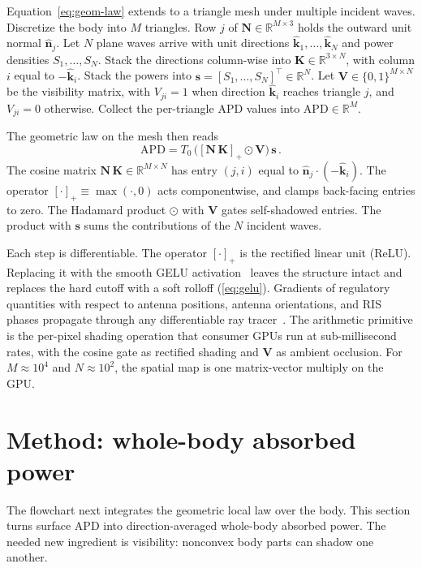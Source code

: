 \documentclass[journal,twocolumn,10pt]{IEEEtran}
\theoremstyle{plain}
\newcommand{\khat}{\hat{\bm{k}}}
\newcommand{\nhat}{\hat{\bm{n}}}
\newcommand{\pospart}[1]{\left[#1\right]_{+}}
\begin{document}
Equation~\eqref{eq:geom-law} extends to a triangle mesh under
multiple incident waves. Discretize the body into $M$ triangles. Row $j$ of
$\mathbf{N} \in \mathbb{R}^{M\times 3}$ holds the outward unit
normal $\nhat_j$. Let $N$ plane waves arrive with unit directions
$\khat_1, \ldots, \khat_N$ and power densities $S_1, \ldots, S_N$.
Stack the directions column-wise into
$\mathbf{K} \in \mathbb{R}^{3\times N}$, with column $i$ equal to
$-\khat_i$. Stack the powers into
$\mathbf{s} = [S_1,\ldots,S_N]^\top \in \mathbb{R}^N$. Let
$\mathbf{V} \in \{0,1\}^{M\times N}$ be the visibility matrix, with
$V_{ji} = 1$ when direction $\khat_i$ reaches triangle $j$, and
$V_{ji} = 0$ otherwise. Collect the per-triangle APD values into
$\bm{\mathrm{APD}} \in \mathbb{R}^{M}$.

The geometric law on the mesh then reads
\begin{equation}\label{eq:mat-multi}
  \bm{\mathrm{APD}} = T_0\,\bigl(\pospart{\mathbf{N}\,\mathbf{K}}
  \odot \mathbf{V}\bigr)\,\mathbf{s}\, .
\end{equation}
The cosine matrix $\mathbf{N}\,\mathbf{K} \in \mathbb{R}^{M\times N}$
has entry $(j,i)$ equal to $\nhat_j\cdot(-\khat_i)$. The operator
$\pospart{\cdot} \equiv \max(\cdot,0)$ acts componentwise, and clamps
back-facing entries to zero. The Hadamard product $\odot$ with
$\mathbf{V}$ gates self-shadowed entries. The product with
$\mathbf{s}$ sums the contributions of the $N$ incident waves.

Each step is differentiable. The operator $\pospart{\cdot}$ is the
rectified linear unit (ReLU). Replacing it with the smooth
\gls{GELU} activation~\cite{Hendrycks2016} leaves the structure
intact and replaces the hard cutoff with a soft rolloff
(\cref{eq:gelu}). Gradients of regulatory quantities with respect to
antenna positions, antenna orientations, and RIS phases propagate
through any differentiable ray tracer~\cite{SionnaRT}. The arithmetic
primitive is the per-pixel shading operation that consumer GPUs run
at sub-millisecond rates, with the cosine gate as rectified shading
and $\mathbf{V}$ as ambient occlusion. For $M \approx 10^4$ and
$N \approx 10^2$, the spatial map is one matrix-vector multiply on
the GPU.

\section{Method: whole-body absorbed power}\label{sec:cauchy}

The flowchart next integrates the geometric local law over the body.
This section turns surface \gls{APD} into direction-averaged
whole-body absorbed power. The needed new ingredient is visibility:
nonconvex body parts can shadow one another.
\end{document}
